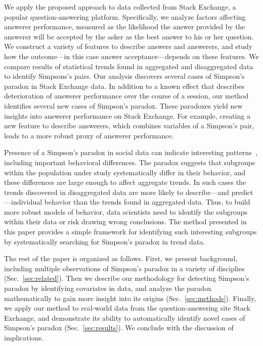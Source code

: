 We apply the proposed approach to data collected from Stack Exchange, a popular question-answering platform. Specifically, we analyze factors affecting answerer performance, measured as the likelihood the answer provided by the answerer will be accepted by the asker as the best answer to his or her question. We construct a variety of features to describe answers and answerers, and study how the outcome---in this case answer acceptance---depends on these features. We compare results of statistical trends found in aggregated and disaggregated data to identify Simpsons's pairs. Our analysis discovers several cases of Simpson's paradox in Stack Exchange data. In addition to a known effect that describes deterioration of answerer performance over the course of a session, our method identifies several new cases of Simpson's paradox. These paradoxes yield new insights into answerer performance on Stack Exchange. For example, creating a new feature to describe answerers, which combines variables of a Simpson's pair, leads to a more robust proxy of answerer performance.

Presence of a Simpson's paradox in social data can indicate interesting patterns~\cite{fabris2000discovering}, including important behavioral differences. The paradox suggests that subgroups within the population under study systematically differ in their behavior, and these differences are large enough to affect aggregate trends. In such cases the trends discovered in disaggregated data are more likely to describe---and predict---individual behavior than the trends found in aggregated data. Thus, to build more robust models of behavior, data scientists need to identify the subgroups within their data %
or risk drawing wrong conclusions.
The method presented in this paper provides a simple framework for identifying such interesting subgroups by systematically searching for Simpson's paradox in trend data.


The rest of the paper is organized as follows. First, we present background, including multiple observations of Simpson's paradox in a variety of disciplies (Sec.~\ref{sec:related}). Then we describe our methodology for detecting Simpson's paradox by identifying covariates in data, and analyze the paradox mathematically to gain more insight into its origins (Sec.~\ref{sec:methods}). Finally, we apply our method to real-world data from the question-answering site Stack Exchange, and demonstrate its ability to automatically identify novel cases of Simpson's paradox (Sec.~\ref{sec:results}). We conclude with the discussion of implications.

